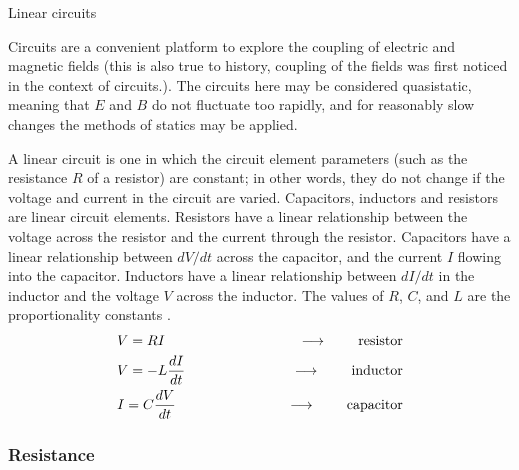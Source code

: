 \documentclass[12pt]{article}
\begin{document}
\begin{flushright} {\color{blue} Linear circuits} \end{flushright}
\begin{flushleft}


Circuits are a convenient platform to explore the coupling of electric and magnetic fields (this is also true to history, coupling of the fields was first noticed in the context of circuits.).  The circuits here may be considered quasistatic, meaning that $E$ and $B$ do not fluctuate too rapidly, and for reasonably slow changes the methods of statics may be applied.  

A linear circuit is one in which the circuit element parameters (such as the resistance $R$ of a resistor) are constant; in other words, they do not change if the voltage and current in the circuit are varied.  Capacitors, inductors and resistors are linear circuit elements.  Resistors have a linear relationship between the voltage across the resistor and the current through the resistor.  Capacitors have a linear relationship between $dV/dt$ across the capacitor, and the current $I$ flowing into the capacitor.  Inductors have a linear relationship between $dI/dt$ in the inductor and the voltage $V$ across the inductor.  The values of $R$, $C$, and $L$ are the proportionality constants
.
\begin{eqnarray*}
& V = RI & \hspace{.9in} \longrightarrow \hspace{.3in} \mbox{resistor} \\
& V = -L\frac{dI}{dt}  & \hspace{.9in} \longrightarrow \hspace{.3in} \mbox{inductor} \\
& I = C \frac{dV}{dt} & \hspace{.9in} \longrightarrow \hspace{.3in} \mbox{capacitor} 
\end{eqnarray*}

\subsubsection*{\bf Resistance}


\end{flushleft}
\end{document}
